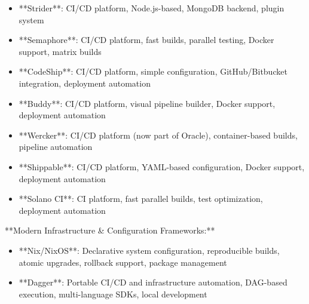 \documentclass[11pt,a4paper]{article}
\begin{document}
\begin{itemize}
\item **Strider**: CI/CD platform, Node.js-based, MongoDB backend, plugin system
\end{itemize}

\begin{itemize}
\item **Semaphore**: CI/CD platform, fast builds, parallel testing, Docker support, matrix builds
\end{itemize}

\begin{itemize}
\item **CodeShip**: CI/CD platform, simple configuration, GitHub/Bitbucket integration, deployment automation
\end{itemize}

\begin{itemize}
\item **Buddy**: CI/CD platform, visual pipeline builder, Docker support, deployment automation
\end{itemize}

\begin{itemize}
\item **Wercker**: CI/CD platform (now part of Oracle), container-based builds, pipeline automation
\end{itemize}

\begin{itemize}
\item **Shippable**: CI/CD platform, YAML-based configuration, Docker support, deployment automation
\end{itemize}

\begin{itemize}
\item **Solano CI**: CI platform, fast parallel builds, test optimization, deployment automation
\end{itemize}

**Modern Infrastructure \& Configuration Frameworks:**

\begin{itemize}
\item **Nix/NixOS**: Declarative system configuration, reproducible builds, atomic upgrades, rollback support, package management
\end{itemize}

\begin{itemize}
\item **Dagger**: Portable CI/CD and infrastructure automation, DAG-based execution, multi-language SDKs, local development
\end{itemize}
\end{document}

